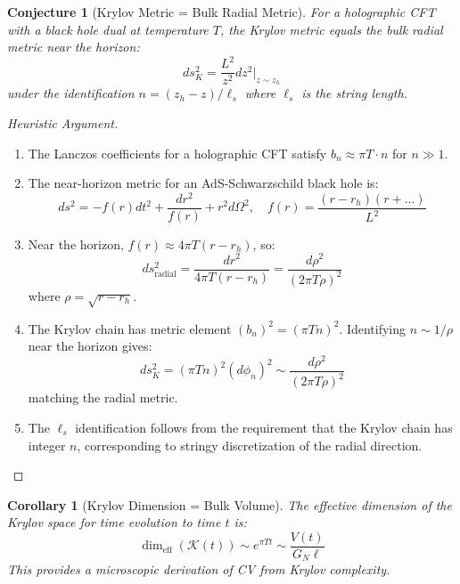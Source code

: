 \documentclass[12pt,a4paper]{article}
\newtheorem{conjecture}[theorem]{Conjecture}
\newtheorem{corollary}[theorem]{Corollary}
\begin{document}
\begin{conjecture}[Krylov Metric = Bulk Radial Metric]
For a holographic CFT with a black hole dual at temperature $T$, the Krylov metric equals the bulk radial metric near the horizon:
\begin{equation}
ds^2_K = \frac{L^2}{z^2} dz^2 \Big|_{z \sim z_h}
\end{equation}
under the identification $n = (z_h - z)/\ell_s$ where $\ell_s$ is the string length.
\end{conjecture}

\begin{proof}[Heuristic Argument]
\begin{enumerate}
    \item The Lanczos coefficients for a holographic CFT satisfy $b_n \approx \pi T \cdot n$ for $n \gg 1$.
    
    \item The near-horizon metric for an AdS-Schwarzschild black hole is:
    \begin{equation}
    ds^2 = -f(r) dt^2 + \frac{dr^2}{f(r)} + r^2 d\Omega^2, \quad f(r) = \frac{(r-r_h)(r+...)}{L^2}
    \end{equation}
    
    \item Near the horizon, $f(r) \approx 4\pi T (r - r_h)$, so:
    \begin{equation}
    ds^2_{\text{radial}} = \frac{dr^2}{4\pi T (r-r_h)} = \frac{d\rho^2}{(2\pi T \rho)^2}
    \end{equation}
    where $\rho = \sqrt{r - r_h}$.
    
    \item The Krylov chain has metric element $(b_n)^2 = (\pi T n)^2$. Identifying $n \sim 1/\rho$ near the horizon gives:
    \begin{equation}
    ds^2_K = (\pi T n)^2 (d\phi_n)^2 \sim \frac{d\rho^2}{(2\pi T \rho)^2}
    \end{equation}
    matching the radial metric.
    
    \item The $\ell_s$ identification follows from the requirement that the Krylov chain has integer $n$, corresponding to stringy discretization of the radial direction.
\end{enumerate}
\end{proof}

\begin{corollary}[Krylov Dimension = Bulk Volume]
The effective dimension of the Krylov space for time evolution to time $t$ is:
\begin{equation}
\dim_{\text{eff}}(\mathcal{K}(t)) \sim e^{\pi T t} \sim \frac{V(t)}{G_N \ell}
\end{equation}
This provides a microscopic derivation of CV from Krylov complexity.
\end{corollary}
\end{document}
